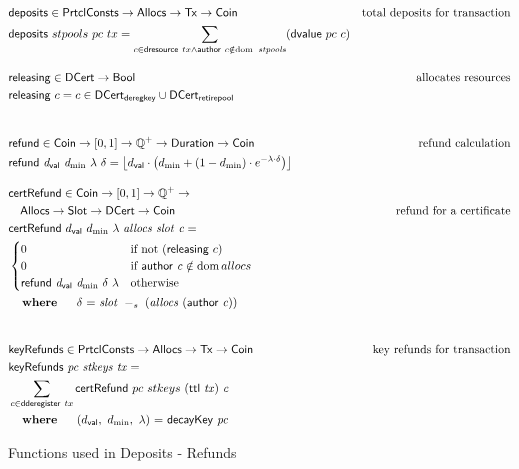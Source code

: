 \documentclass[11pt,a4paper,dvipsnames]{article}
\newcommand{\Tx}{\type{Tx}}
\newcommand{\Coin}{\type{Coin}}
\newcommand{\PrtclConsts}{\type{PrtclConsts}}
\newcommand{\Slot}{\type{Slot}}
\newcommand{\Duration}{\type{Duration}}
\newcommand{\Allocs}{\type{Allocs}}
\newcommand{\DCert}{\type{DCert}}
\newcommand{\DCertDeRegKey}{\type{DCert_{deregkey}}}
\newcommand{\DCertRetirePool}{\type{DCert_{retirepool}}}
\newcommand{\ttl}[1]{\fun{ttl}~ \var{#1}}
\newcommand{\certRefund}[6]{\fun{certRefund}~ {#1}~{#2}~{#3}~\var{#4}~\var{#5}~\var{#6}}
\newcommand{\refund}[4]{\fun{refund}~ \var{#1}~ \var{#2}~ {#3}~ {#4}}
\newcommand{\keyRefunds}[3]{\fun{keyRefunds}~ \var{#1}~ \var{#2}~ \var{#3}}
\newcommand{\cauthor}[1]{\fun{author}~ \var{#1}}
\newcommand{\slotminus}[2]{\var{#1}~-_{s}~\var{#2}}
\DeclarePairedDelimiter\floor{\lfloor}{\rfloor}
\newcommand{\dval}{\ensuremath{d_{\mathsf{val}}}}
\theoremstyle{definition}
\theoremstyle{definition}
\begin{document}
\begin{figure}
  \begin{align*}
    & \fun{deposits} \in \PrtclConsts \to \Allocs \to \Tx \to \Coin
    & \text{total deposits for transaction} \\
    & \fun{deposits}~{stpools}~{pc}~{tx} = \sum\limits_{c \in \fun{dresource}~tx
        \wedge \fun{author}~c \notin \dom~\var{stpools}}(\fun{dvalue}~pc~c)
      \nextdef
      & \fun{releasing} \in \DCert \to \mathsf{Bool}
      & \text{allocates resources} \\
      & \fun{releasing}~c = c \in \DCertDeRegKey \cup \DCertRetirePool\\
      \nextdef
      & \fun{refund} \in \Coin \to [0, 1] \to \mathbb{Q}^{+} \to \Duration \to \Coin
      & \text{refund calculation} \\
      & \refund{\dval}{d_{\min}}{\lambda}{\delta} =
            \floor*{
              \dval \cdot
            \left(d_{\min}+(1-d_{\min})\cdot e^{-\lambda\cdot\delta}\right)}
      \nextdef
      & \fun{certRefund} \in \Coin \to [0, 1] \to \mathbb{Q}^{+} \to \\
      & ~~~\Allocs \to \Slot \to \DCert \to \Coin
      & \text{refund for a certificate} \\
      & \certRefund{\dval}{d_{\min}}{\lambda}{allocs}{slot}{c} =\\
      & \begin{cases}
        0 & \text{if not}~(\fun{releasing}~c)\\
            0 & \text{if}~\cauthor c \notin \dom allocs\\
            \refund{\dval}{d_{\min}}{\delta}{\lambda}
            & \text{otherwise}
        \end{cases}\\
      &
      \begin{array}{lr@{~=~}l}
        \where
        &\delta & \slotminus{slot}{(allocs~(\cauthor c))}\\
      \end{array}\\
      \nextdef
      & \fun{keyRefunds} \in \PrtclConsts \to \Allocs \to \Tx \to \Coin
      & \text{key refunds for transaction} \\
      & \keyRefunds{pc}{stkeys}{tx} =\\
      &   \sum\limits_{c \in \fun{dderegister}~tx} \certRefund{pc}{stkeys}{(\ttl{tx})}{c}{}{}\\
      &
      \begin{array}{lr@{~=~}l}
        \where
        & (\dval,~d_{\min},~\lambda) & \fun{decayKey}~\var{pc}\\
      \end{array}\\
  \end{align*}
  \caption{Functions used in Deposits - Refunds}
  \label{fig:functions:deposits-refunds}
\end{figure}
\end{document}
